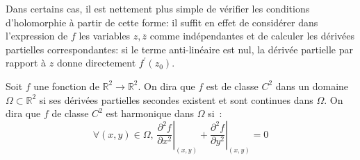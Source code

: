 Dans certains cas, il est nettement
plus simple de vérifier les conditions d'holomorphie à partir de cette forme: il
suffit en effet de considérer dans l'expression de $f$ les variables
$z,\overline{z}$ comme indépendantes et de calculer les dérivées partielles
correspondantes: si le terme anti-linéaire est nul, la dérivée partielle par
rapport à $z$ donne directement $f^\prime(z_0)$.

Soit $f$ une fonction de $\mathbb{R}^2 \to \mathbb{R}^2$. On dira que
$f$ est de classe $C^2$ dans un domaine  $\Omega \subset \mathbb{R}^2$
si ses dérivées partielles secondes existent et sont continues dans
$\Omega$. On dira que $f$ de classe $C^2$ est harmonique dans $\Omega$ si~:
\[
\forall (x,y) \in \Omega, \, \left . \frac{\partial^2 f}{\partial x^2}
\right |_{(x,y)} + \left . \frac{\partial^2 f}{\partial y^2} \right
|_{(x,y)} = 0 
\]

